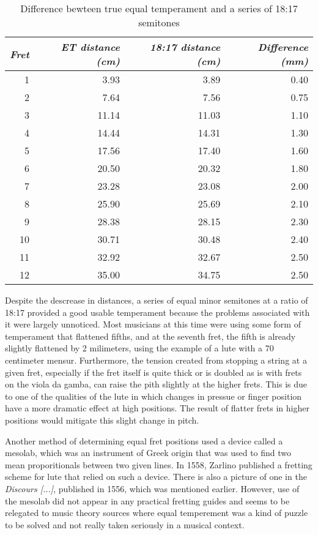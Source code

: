 \begin{table}[h!]
    \begin{center}
    \begin{tabular}{ r r r r }
      \textit{Fret} & \textit{ET distance (cm)} & \textit{18:17 distance (cm)} & \textit{Difference (mm)} \\
      \hline
      1  & 3.93	  & 3.89	& 0.40 \\
      2  & 7.64	  & 7.56	& 0.75 \\
      3  & 11.14	& 11.03	& 1.10 \\
      4  & 14.44	& 14.31	& 1.30 \\
      5  & 17.56	& 17.40	& 1.60 \\
      6  & 20.50	& 20.32	& 1.80 \\
      7  & 23.28	& 23.08	& 2.00 \\
      8  & 25.90	& 25.69 & 2.10 \\
      9  & 28.38	& 28.15	& 2.30 \\
      10 & 30.71	& 30.48	& 2.40 \\
      11 & 32.92	& 32.67	& 2.50 \\
      12 & 35.00	& 34.75	& 2.50 \\
    \end{tabular}
    \end{center}
    \caption{Difference bewteen true equal temperament and a series of 18:17 semitones}
\end{table}

Despite the descrease in distances, a series of equal minor semitones at a ratio of 18:17
provided a good usable temperament because the problems associated with it were largely unnoticed.
Most musicians at this time were using some form of temperament that flattened fifths, and at the
seventh fret, the fifth is already slightly flattened by 2 milimeters, using the example of a
lute with a 70 centimeter mensur.  Furthermore, the tension created from stopping a string
at a given fret, especially if the fret itself is quite thick or is doubled as is with frets
on the viola da gamba, can raise the pith slightly at the higher frets. \autocite[21]{ML:1}  This
is due to one of the qualities of the lute in which changes in pressue or finger position have a
more dramatic effect at high positions.  The result of flatter frets in higher
positions would mitigate this slight change in pitch.

Another method of determining equal fret positions used a device called a mesolab, which was
an instrument of Greek origin that was used to find two mean proporitionals between two
given lines.  In 1558, Zarlino published a fretting scheme for lute that relied on such a device.
\autocite[26]{ML:1}  There is also a picture of one in the \textit{Discours [...]}, published in
1556, which was mentioned earlier.  However, use of the mesolab did not appear in any practical
fretting guides and seems to be relegated to music theory sources where equal temperement
was a kind of puzzle to be solved and not really taken seriously in a musical context.

